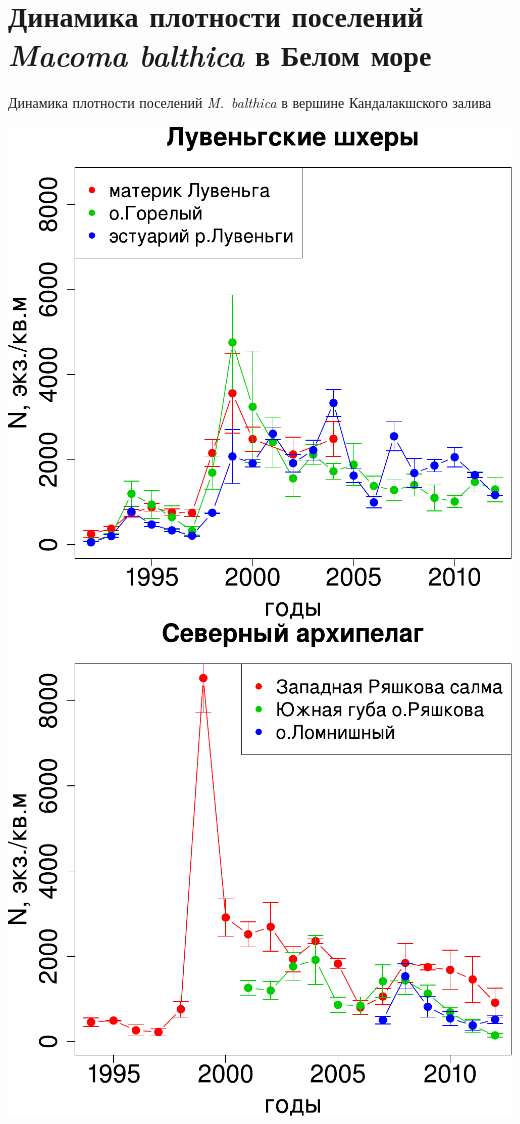 \documentclass{beamer}
\begin{document}
		\section[Динамика численности]{Динамика плотности поселений {\it Macoma balthica} в Белом море}

\begin{frame}{Динамика плотности поселений {\it M.~balthica} в вершине Кандалакшского залива}
	\begin{minipage}[b]{.45\linewidth}
		\begin{center}
			\includegraphics[height=.32\textheight]{N2_dynamic_Luvenga_big1.pdf}\\
			\includegraphics[height=.32\textheight]{N2_dynamic_North_big1.pdf}

\end{center}
\end{minipage}
\end{frame}
\end{document}
